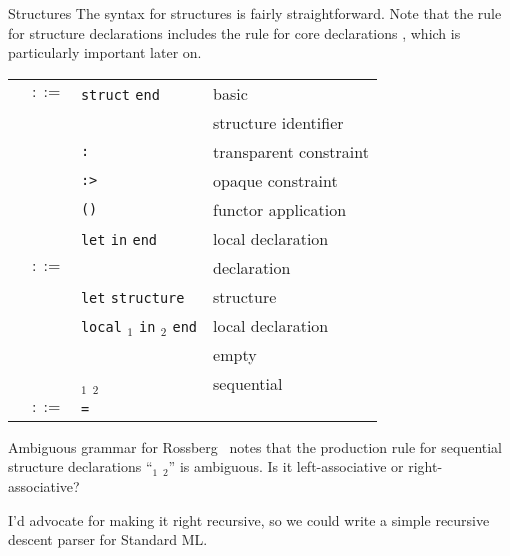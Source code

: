 \begin{grammar}{Structures}
  The syntax for structures is fairly straightforward. Note that
  the rule for structure declarations  includes the
  rule for core declarations , which is particularly
  important later on.
\begin{longtable}{rcll}
\label{grammar:strexp}\nonterminal{strexp} & $::=$ & \texttt{struct} \nonterminal{strdec} \texttt{end}
& basic\\
& \alt & \nonterminal{longstrid} & structure identifier\\
&\alt& \nonterminal{strexp} \texttt{:} \hyperref[grammar:sigexp]{\nonterminal{sigexp}} & transparent constraint\\
&\alt& \nonterminal{strexp} \texttt{:>} \hyperref[grammar:sigexp]{\nonterminal{sigexp}} & opaque constraint\\
&\alt& \nonterminal{funid}\texttt{(}\nonterminal{strexp}\texttt{)} & functor application\\
&\alt&\texttt{let} \nonterminal{strdec} \texttt{in} \nonterminal{strexp} \texttt{end} & local declaration\\
\label{grammar:strdec}\nonterminal{strdec} & $::=$ & \hyperref[grammar:dec]{\nonterminal{dec}}
& declaration\\
&\alt&\texttt{let} \texttt{structure} \nonterminal{strbind} & structure\\
&\alt&\texttt{local} \nonterminal{strdec}$_{1}$ \texttt{in} \nonterminal{strdec}$_{2}$ \texttt{end} & local declaration\\
&\alt& & empty\\
&\alt&\nonterminal{strdec}$_{1}$ \optional{\texttt{;}} \nonterminal{strdec}$_{2}$ & sequential\\
\label{grammar:strbind}\nonterminal{strbind} & $::=$ & \nonterminal{strid} \texttt{=} \nonterminal{strexp} \optional{\texttt{and} \nonterminal{strbind}} & \\
\end{longtable}
\end{grammar}

\begin{remark}{Ambiguous grammar for }
Rossberg~\cite{rossberg2018defects} notes that the production rule for
sequential structure declarations ``$_{1}$ \optional{\texttt{;}} $_{2}$''
is ambiguous. Is it left-associative or right-associative?

I'd advocate for making it right recursive, so we could write a simple
recursive descent parser for Standard ML.
\end{remark}

